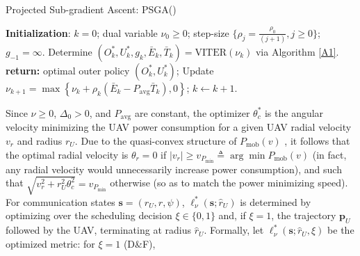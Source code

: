 \documentclass[10pt, twocolumn]{IEEEtran}
\theoremstyle{plain}
\theoremstyle{definition}
\theoremstyle{remark}
\begin{document}
\begin{algorithm*}[t]
\caption{Projected Sub-gradient Ascent: PSGA()}\label{A2}
    \begin{algorithmic}[1]
    \scriptsize
    \State \textbf{Initialization}: $k{=}0$; dual variable $\nu_{0}{\geq}0$; step-size $\{\rho_{j}{=}\frac{\rho_{0}}{(j{+}1)},j{\geq}0\}$; $g_{-1}{=}\infty$.
    \vspace{0.1cm}
        \vspace{0.1cm}
    	\State Determine $(O_{k}^{*},U_{k}^{*},g_{k},\bar{E}_{k},\bar{T}_{k})=\mathrm{VITER}\left(\nu_{k}\right)$ via Algorithm \ref{A1}.
    	\vspace{0.1cm}
    	    \vspace{0.1cm}
    	    \State \textbf{return:} optimal outer policy $(O_{k}^{*},U_{k}^{*})$;
    	    \vspace{0.1cm}
    	\Else
    	    \vspace{0.1cm}
    		\State Update $\nu_{k{+}1}{=}\max\left\{\nu_{k}{+}\rho_{k}\left( \bar{E}_{k}{-}P_{\mathrm{avg}}\bar{T}_{k}\right),0\right\}$; $k{\gets}k{+}1$.
    		\vspace{0.1cm}
    	\EndIf
    	\vspace{0.1cm}
    \EndFor
    \end{algorithmic}
\end{algorithm*}
Since $\nu{\geq}0$, $\Delta_{0}{>}0$, and $P_{\mathrm{avg}}$ are constant, the optimizer $\theta_{c}^{*}$ is the angular velocity minimizing the UAV power consumption for a given UAV radial velocity $v_{r}$ and radius $r_{U}$. Due to the quasi-convex structure of $P_{\mathrm{mob}}(v)$ \cite{SCA}, it follows that the optimal radial velocity is 
$\theta_r=0$ if $|v_r|\geq v_{P_{\mathrm{min}}}\triangleq\arg\min P_{\mathrm{mob}}(v)$ (in fact, any radial velocity would unnecessarily increase power consumption), and such that $\sqrt{v_{r}^2 + r_U^2\theta_c^2}=v_{P_{\mathrm{min}}}$ otherwise (so as to match the power minimizing speed). For communication states $\mathbf{s}{=}(r_{U},r,\psi)$, $\ell_{\nu}^{*}(\mathbf{s};\hat{r}_{U})$ is determined by optimizing over the scheduling decision $\xi{\in}\{0,1\}$ and, if $\xi{=}1$, the trajectory $\mathbf{p}_{U}$ followed by the UAV, terminating at radius $\hat{r}_{U}$. Formally, let $\ell_{\nu}^{*}(\mathbf{s};\hat{r}_{U},\xi)$ be the optimized metric: for $\xi{=}1$ (D\&F),
\end{document}
